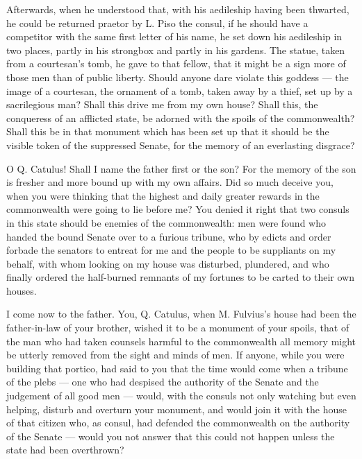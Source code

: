  Afterwards, when he understood that, with his aedileship having been thwarted, he could be returned praetor by L. Piso the consul, if he should have a competitor with the same first letter of his name, he set down his aedileship in two places, partly in his strongbox and partly in his gardens. The statue, taken from a courtesan's tomb, he gave to that fellow, that it might be a sign more of those men than of public liberty. Should anyone dare violate this goddess --- the image of a courtesan, the ornament of a tomb, taken away by a thief, set up by a sacrilegious man? Shall this drive me from my own house? Shall this, the conqueress of an afflicted state, be adorned with the spoils of the commonwealth? Shall this be in that monument which has been set up that it should be the visible token of the suppressed Senate, for the memory of an everlasting disgrace?

 O Q. Catulus! Shall I name the father first or the son? For the memory of the son is fresher and more bound up with my own affairs. Did so much deceive you, when you were thinking that the highest and daily greater rewards in the commonwealth were going to lie before me? You denied it right that two consuls in this state should be enemies of the commonwealth: men were found who handed the bound Senate over to a furious tribune, who by edicts and order forbade the senators to entreat for me and the people to be suppliants on my behalf, with whom looking on my house was disturbed, plundered, and who finally ordered the half-burned remnants of my fortunes to be carted to their own houses.

 I come now to the father. You, Q. Catulus, when M. Fulvius's house had been the father-in-law of your brother, wished it to be a monument of your spoils, that of the man who had taken counsels harmful to the commonwealth all memory might be utterly removed from the sight and minds of men. If anyone, while you were building that portico, had said to you that the time would come when a tribune of the plebs --- one who had despised the authority of the Senate and the judgement of all good men --- would, with the consuls not only watching but even helping, disturb and overturn your monument, and would join it with the house of that citizen who, as consul, had defended the commonwealth on the authority of the Senate --- would you not answer that this could not happen unless the state had been overthrown?

